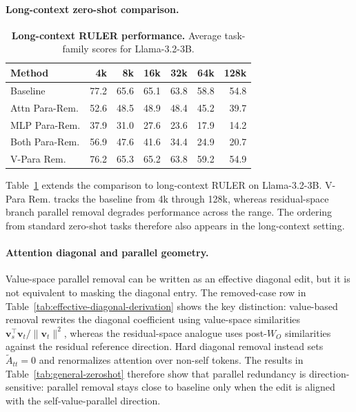 \paragraph{Long-context zero-shot comparison.}
\begin{table}
  \centering
  \caption{\textbf{Long-context RULER performance.}
  Average task-family scores for Llama-3.2-3B.}
  \label{tab:longcontext-ruler}
  \scriptsize
  \setlength{\tabcolsep}{4.2pt}
  \renewcommand{\arraystretch}{0.86}
  \begin{tabular}{lrrrrrr}
    \toprule
    Method & 4k & 8k & 16k & 32k & 64k & 128k \\
    \midrule
    Baseline & 77.2 & 65.6 & 65.1 & 63.8 & 58.8 & 54.8 \\
    Attn Para-Rem. & 52.6 & 48.5 & 48.9 & 48.4 & 45.2 & 39.7 \\
    MLP Para-Rem. & 37.9 & 31.0 & 27.6 & 23.6 & 17.9 & 14.2 \\
    Both Para-Rem. & 56.9 & 47.6 & 41.6 & 34.4 & 24.9 & 20.7 \\
    V-Para Rem. & 76.2 & 65.3 & 65.2 & 63.8 & 59.2 & 54.9 \\
    \bottomrule
  \end{tabular}
  \vspace{-0.8em}
\end{table}
Table~\ref{tab:longcontext-ruler} extends the comparison to long-context
RULER on Llama-3.2-3B. V-Para Rem. tracks the baseline from 4k through 128k,
whereas residual-space branch parallel removal degrades performance across
the range. The ordering from standard zero-shot tasks therefore also appears
in the long-context setting.

\paragraph{Attention diagonal and parallel geometry.}
\label{sec:diagonal-validation}
Value-space parallel removal can be written as an effective diagonal edit, but
it is not equivalent to masking the diagonal entry. The removed-case row in
Table~\ref{tab:effective-diagonal-derivation} shows the key distinction:
value-based removal rewrites the diagonal coefficient using value-space
similarities \(\mathbf{v}_s^\top\mathbf{v}_t/\|\mathbf{v}_t\|^2\), whereas the
residual-space analogue uses post-\(W_O\) similarities against the residual
reference direction. Hard diagonal removal instead sets
\(\widetilde A_{tt}=0\) and renormalizes attention over non-self tokens. The
results in Table~\ref{tab:general-zeroshot} therefore show that parallel
redundancy is direction-sensitive: parallel removal stays close to baseline
only when the edit is aligned with the self-value-parallel direction.

